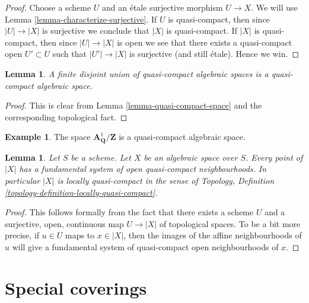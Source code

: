 \documentclass{stacks-project}
\theoremstyle{plain}
\newtheorem{lemma}[subsection]{Lemma}
\theoremstyle{definition}
\newtheorem{example}[subsection]{Example}
\theoremstyle{remark}
\numberwithin{equation}{subsection}
\begin{document}
\begin{proof}
Choose a scheme $U$ and an \'etale surjective morphism $U \to X$.
We will use Lemma \ref{lemma-characterize-surjective}.
If $U$ is quasi-compact, then since $|U| \to |X|$ is surjective
we conclude that $|X|$ is quasi-compact.
If $|X|$ is quasi-compact, then since $|U| \to |X|$ is open
we see that there exists a quasi-compact open $U' \subset U$
such that $|U'| \to |X|$ is surjective (and still \'etale).
Hence we win.
\end{proof}

\begin{lemma}
\label{lemma-finite-disjoint-quasi-compact}
A finite disjoint union of quasi-compact algebraic spaces is
a quasi-compact algebraic space.
\end{lemma}

\begin{proof}
This is clear from
Lemma \ref{lemma-quasi-compact-space}
and the corresponding topological fact.
\end{proof}

\begin{example}
\label{example-quasi-compact-not-very-reasonable}
The space $\mathbf{A}^1_{\mathbf{Q}}/\mathbf{Z}$ is a quasi-compact
algebraic space.
\end{example}

\begin{lemma}
\label{lemma-space-locally-quasi-compact}
Let $S$ be a scheme.
Let $X$ be an algebraic space over $S$.
Every point of $|X|$ has a fundamental system of open
quasi-compact neighbourhoods.
In particular $|X|$ is locally quasi-compact in the sense of
Topology, Definition \ref{topology-definition-locally-quasi-compact}.
\end{lemma}

\begin{proof}
This follows formally from the fact that there exists a scheme
$U$ and a surjective, open, continuous map
$U \to |X|$ of topological spaces. To be a bit more precise, if
$u \in U$ maps to $x \in |X|$, then the images of the affine
neighbourhoods of $u$ will give a fundamental system of quasi-compact
open neighbourhoods of $x$.
\end{proof}







\section{Special coverings}
\label{section-special-coverings}
\end{document}
